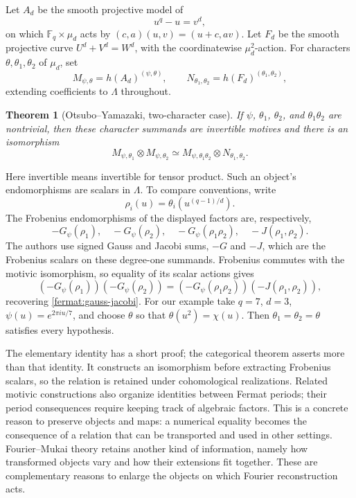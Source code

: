\documentclass[11pt]{article}
\newtheorem{theorem}[proposition]{Theorem}
\theoremstyle{remark}
\begin{document}
Let \(A_d\) be the smooth projective model of
\[
u^q-u=v^d,
\]
on which \(\mathbb F_q\times\mu_d\) acts by \((c,a)(u,v)=(u+c,av)\). Let \(F_d\) be the smooth projective curve \(U^d+V^d=W^d\), with the coordinatewise \(\mu_d^2\)-action. For characters \(\theta,\theta_1,\theta_2\) of \(\mu_d\), set
\[
M_{\psi,\theta}=h(A_d)^{(\psi,\theta)},\qquad
N_{\theta_1,\theta_2}=h(F_d)^{(\theta_1,\theta_2)},
\]
extending coefficients to \(\Lambda\) throughout.

\begin{theorem}[Otsubo--Yamazaki, two-character case]
If \(\psi\), \(\theta_1\), \(\theta_2\), and \(\theta_1\theta_2\) are nontrivial, then these character summands are invertible motives and there is an isomorphism
\begin{equation}
M_{\psi,\theta_1}\otimes M_{\psi,\theta_2}
\simeq
M_{\psi,\theta_1\theta_2}\otimes N_{\theta_1,\theta_2}.
\label{fermat:motivic-identity}
\end{equation}
\end{theorem}

Here invertible means invertible for tensor product. Such an object's endomorphisms are scalars in \(\Lambda\). To compare conventions, write
\[
\rho_i(u)=\theta_i\!\left(u^{(q-1)/d}\right).
\]
The Frobenius endomorphisms of the displayed factors are, respectively,
\[
-G_\psi(\rho_1),\quad -G_\psi(\rho_2),\quad
-G_\psi(\rho_1\rho_2),\quad -J(\rho_1,\rho_2).
\]
The authors use signed Gauss and Jacobi sums, \(-G\) and \(-J\), which are the Frobenius scalars on these degree-one summands. Frobenius commutes with the motivic isomorphism, so equality of its scalar actions gives
\[
(-G_\psi(\rho_1))(-G_\psi(\rho_2))
=(-G_\psi(\rho_1\rho_2))(-J(\rho_1,\rho_2)),
\]
recovering \eqref{fermat:gauss-jacobi}. For our example take \(q=7\), \(d=3\), \(\psi(u)=e^{2\pi iu/7}\), and choose \(\theta\) so that \(\theta(u^2)=\chi(u)\). Then \(\theta_1=\theta_2=\theta\) satisfies every hypothesis.

The elementary identity has a short proof; the categorical theorem asserts more than that identity. It constructs an isomorphism before extracting Frobenius scalars, so the relation is retained under cohomological realizations. Related motivic constructions also organize identities between Fermat periods; their period consequences require keeping track of algebraic factors. This is a concrete reason to preserve objects and maps: a numerical equality becomes the consequence of a relation that can be transported and used in other settings. Fourier--Mukai theory retains another kind of information, namely how transformed objects vary and how their extensions fit together. These are complementary reasons to enlarge the objects on which Fourier reconstruction acts.
\end{document}
